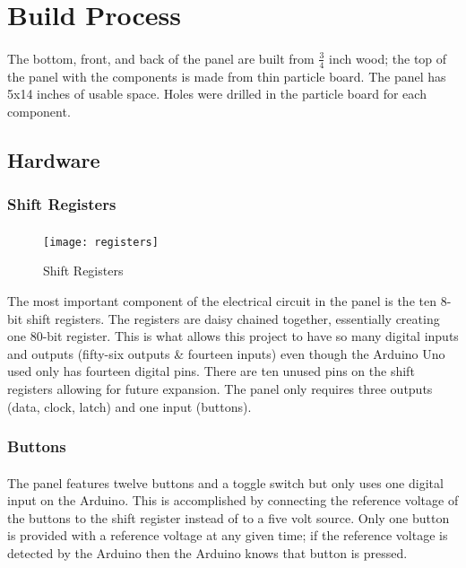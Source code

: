 \documentclass[12pt,a4paper]{article}
\begin{document}
\section{Build Process}
\paragraph{}
The bottom, front, and back of the panel are built from \(\frac{3}{4}\)  inch wood; the top of the panel with the components is made from thin particle board. The panel has 5x14 inches of usable space. Holes were drilled in the particle board for each component.
\newpage
\subsection{Hardware}
\subsubsection{Shift Registers}
\paragraph{}
\begin{figure}
	\vspace*{-0.5cm}
	\centering
	\texttt{[image: registers]}
	\caption{Shift Registers}
	\label{fig:circuit}
\end{figure}
The most important component of the electrical circuit in the panel is the ten 8-bit shift registers. The registers are daisy chained together, essentially creating one 80-bit register. This is what allows this project to have so many digital inputs and outputs (fifty-six outputs \& fourteen inputs) even though the Arduino Uno used only has fourteen digital pins. There are ten unused pins on the shift registers allowing for future expansion. The panel only requires three outputs (data, clock, latch) and one input (buttons).
\subsubsection{Buttons}
\paragraph{}
The panel features twelve buttons and a toggle switch but only uses one digital input on the Arduino. This is accomplished by connecting the reference voltage of the buttons to the shift register instead of to a five volt source. Only one button is provided with a reference voltage at any given time; if the reference voltage is detected by the Arduino then the Arduino knows that button is pressed.
\end{document}
